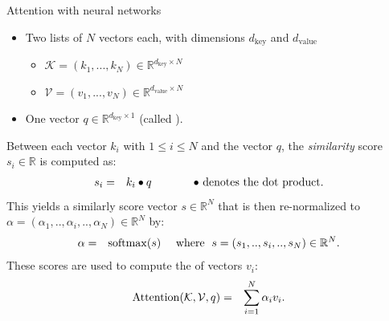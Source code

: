\begin{frame}{Attention with neural networks}
\begin{itemize}
\item Two lists of $N$ vectors each, with dimensions $d_{\text{key}}$ and $d_{\text{value}}$\\
\begin{itemize}
\item {} $\mathcal{K} = (k_1, ..., k_N) \in \mathbb{R}^{d_{\text{key}} \times N}$ \\
\item {} $\mathcal{V}=(v_1, ..., v_N) \in \mathbb{R}^{d_{\text{value}} \times N}$\\
\end{itemize}
\item One vector $q \in \mathbb{R}^{d_{\text{key}} \times 1}$ (called ).\\
\end{itemize}
\pause
\vspace{1mm}
Between each  vector $k_{i}$ with $1 \leq i \leq N$ and the  vector $q$, the \textit{similarity} score $s_{i} \in \mathbb{R}$ is computed as:
      \begin{eqnarray*}
              s_{i}&=& k_{i}\bullet q\text{\hspace{12mm} $\bullet$ denotes the dot product.}
      \end{eqnarray*}
\pause
This yields a similarly score vector $s \in \mathbb{R}^{N}$ that is then re-normalized to $\alpha = (\alpha_{1}, .., \alpha_{i}, .., \alpha_{N}) \in \mathbb{R}^{N}$ by:
      \begin{eqnarray*}
              \alpha &=& \operatorname{softmax}(s) \text{\hspace{3.5mm} where \hspace{1mm}} s = (s_{1}, .., s_{i}, .., s_{N}) \in \mathbb{R}^{N}.
      \end{eqnarray*}
\pause
These scores are used to compute the  of  vectors $v_{i}$:
      \begin{eqnarray*}
              \operatorname{Attention}(\mathcal{K}, \mathcal{V}, q) &=& \sum_{i=1}^{N} \alpha_{i} v_{i}.
      \end{eqnarray*}
\end{frame}

